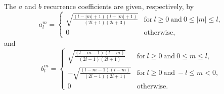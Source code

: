 The $a$ and $b$ recurrence coefficients are given, respectively, by \citep[Eq.~(145)]{Zotter2009PhD}
\begin{equation}\label{eq:A1_Navigation_Filters:Recurrence_Coefficient_a}
a_l^m =
\begin{cases}
  \displaystyle \sqrt{\frac{(l - |m| + 1) (l + |m| + 1)}{(2 l + 1) (2 l + 3)}} & \text{for}~l \geq 0~\text{and}~0 \leq |m| \leq l, \\
  0 & \text{otherwise,}
\end{cases}
\end{equation}
and \citep[Eq.~(146)]{Zotter2009PhD}
\begin{equation}\label{eq:A1_Navigation_Filters:Recurrence_Coefficient_b}
b_l^m =
\begin{cases}
  \displaystyle \sqrt{\frac{(l - m - 1) (l - m)}{(2 l - 1) (2 l + 1)}} & \text{for}~l \geq 0~\text{and}~0 \leq m \leq l, \\
  \displaystyle -\sqrt{\frac{(l - m - 1) (l - m)}{(2 l - 1) (2 l + 1)}} & \text{for}~l \geq 0~\text{and}~-l \leq m < 0, \\
  0 & \text{otherwise.}
\end{cases}
\end{equation}